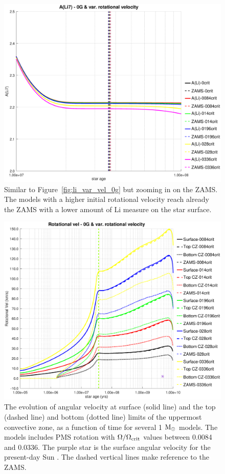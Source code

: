 \documentclass[fleqn,usenatbib]{mnras}
\begin{document}
{{\begin{figure}
	\includegraphics[trim = 35mm 15mm 20mm 15mm, clip,width=\columnwidth]{figures/li_var_vel_0_0g_z1.eps}
    \caption {Similar to Figure~\ref{fig:li_var_vel_0g} but zooming in on the ZAMS. The models with a higher initial rotational velocity reach already the ZAMS with a lower amount of Li measure on the star surface.}
    \label{fig:li_var_vel_0g_z1}
\end{figure}

\begin{figure}
	\includegraphics[trim = 30mm 15mm 20mm 15mm, clip,width=\columnwidth]{figures/rot_vel_var_vel_0_0g.eps}
    \caption{The evolution of angular velocity at surface (solid line) and the top (dashed line) and bottom (dotted line) limits of the uppermost convective zone, as a function of time for several 1 $\mathrm{M}_\odot$ models. The models includes PMS rotation with $\Omega / \Omega_{\mathrm{crit}}$ values between 0.0084 and 0.0336. The purple star is the surface angular velocity for the present-day Sun \citep{Gill2012}. The dashed vertical lines make reference to the ZAMS.}
    \label{fig:rot_vel_0g}
\end{figure}

}}
\end{document}
